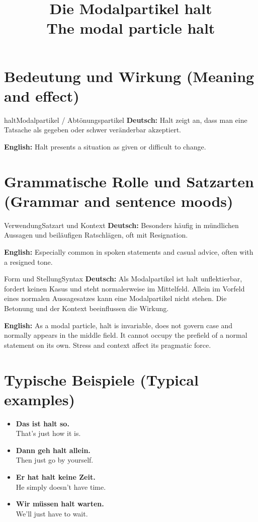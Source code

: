 \documentclass[a4paper,11pt]{article}
\title{Die Modalpartikel \glqq halt\grqq\\{\large\textnormal{The modal particle halt}}}
\date{}
\newcommand{\GermanText}[1]{\textbf{Deutsch: }#1\par}
\newcommand{\EnglishText}[1]{{\small\color{SoftGray}\textbf{English: }#1\par}}
\newcommand{\ExampleItem}[2]{\item \textbf{#1}\\{\small\color{SoftGray}#2}}
\begin{document}
\maketitle
\tableofcontents
\section{Bedeutung und Wirkung \textnormal{(Meaning and effect)}}
\begin{grammarentry}{halt}{Modalpartikel / Abtönungspartikel}
\GermanText{Halt zeigt an, dass man eine Tatsache als gegeben oder schwer veränderbar akzeptiert.}
\EnglishText{Halt presents a situation as given or difficult to change.}
\end{grammarentry}
\section{Grammatische Rolle und Satzarten \textnormal{(Grammar and sentence moods)}}
\begin{grammarentry}{Verwendung}{Satzart und Kontext}
\GermanText{Besonders häufig in mündlichen Aussagen und beiläufigen Ratschlägen, oft mit Resignation.}
\EnglishText{Especially common in spoken statements and casual advice, often with a resigned tone.}
\end{grammarentry}
\begin{grammarentry}{Form und Stellung}{Syntax}
\GermanText{Als Modalpartikel ist halt unflektierbar, fordert keinen Kasus und steht normalerweise im Mittelfeld. Allein im Vorfeld eines normalen Aussagesatzes kann eine Modalpartikel nicht stehen. Die Betonung und der Kontext beeinflussen die Wirkung.}
\EnglishText{As a modal particle, halt is invariable, does not govern case and normally appears in the middle field. It cannot occupy the prefield of a normal statement on its own. Stress and context affect its pragmatic force.}
\end{grammarentry}
\section{Typische Beispiele \textnormal{(Typical examples)}}
\begin{exbox}\begin{itemize}
\ExampleItem{Das ist halt so.}{That's just how it is.}
\ExampleItem{Dann geh halt allein.}{Then just go by yourself.}
\ExampleItem{Er hat halt keine Zeit.}{He simply doesn't have time.}
\ExampleItem{Wir müssen halt warten.}{We'll just have to wait.}
\end{itemize}\end{exbox}
\end{document}
